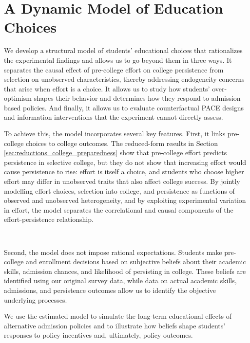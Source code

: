 \section{A Dynamic Model of Education Choices}\label{sec:structural_model}



We develop a structural model of students' educational choices that rationalizes the experimental findings and allows us to go beyond them in three ways. It separates the causal effect of pre-college effort on college persistence from selection on unobserved characteristics, thereby addressing endogeneity concerns that arise when effort is a choice. It allows us to study how students' over-optimism shapes their behavior and determines how they respond to admission-based policies. And finally, it allows us to evaluate counterfactual PACE designs and information interventions that the experiment cannot directly assess.\par  






To achieve this, the model incorporates several key features. First, it links pre-college choices to college outcomes. The reduced-form results in Section \ref{sec:reductions_college_preparedness} show that pre-college effort predicts persistence in selective college, but they do not show that increasing effort would cause persistence to rise: effort is itself a choice, and students who choose higher effort may differ in unobserved traits that also affect college success. By jointly modelling effort choices, selection into college, and persistence as functions of observed and unobserved heterogeneity, and by exploiting experimental variation in effort, the model separates the correlational and causal components of the effort-persistence relationship.\par\




Second, the model does not impose rational expectations. Students make pre-college and enrollment decisions based on subjective beliefs about their academic skills, admission chances, and likelihood of persisting in college. These beliefs are identified using our original survey data, while data on actual academic skills, admissions, and persistence outcomes allow us to identify the objective underlying processes. \par 


We use the estimated model to simulate the long-term educational effects of alternative admission policies and to illustrate how beliefs shape students’ responses to policy incentives and, ultimately, policy outcomes.\par 



